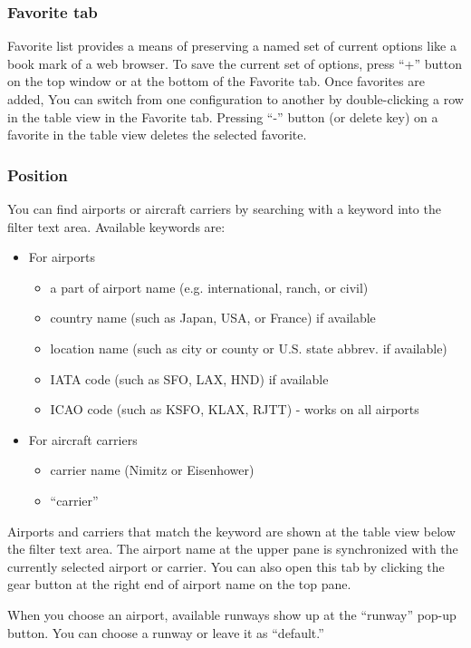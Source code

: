 \subsubsection{Favorite tab}
Favorite list provides a means of preserving a named set of current options like a book mark of a web browser. To save the current set of options, press ``+'' button on the top window or at the bottom of the Favorite tab. Once favorites are added, You can switch from one configuration to another by double-clicking a row in the table view in the Favorite tab. Pressing ``-'' button (or delete key) on a favorite in the table view deletes the selected favorite.

\subsubsection{Position}
You can find airports or aircraft carriers by searching with a keyword into the filter text area. Available keywords are:

\begin{itemize}
\item For airports
	\begin {itemize} 
	\item a part of airport name (e.g. international, ranch, or civil)
	\item country name (such as Japan, USA, or France) if available
	\item location name (such as city or county or U.S. state abbrev. if available)
	\item IATA code (such as SFO, LAX, HND) if available
	\item ICAO code (such as KSFO, KLAX, RJTT) - works on all airports
	\end{itemize}
\item For aircraft carriers
	\begin{itemize}
	\item carrier name (Nimitz or Eisenhower)
	\item ``carrier''
	\end{itemize}
\end{itemize}
Airports and carriers that match the keyword are shown at the table view below the filter text area. The airport name at the upper pane is synchronized with the currently selected airport or carrier. You can also open this tab by clicking the gear button at the right end of airport name on the top pane.

When you choose an airport, available runways show up at the ``runway'' pop-up button. You can choose a runway or leave it as ``default.''

